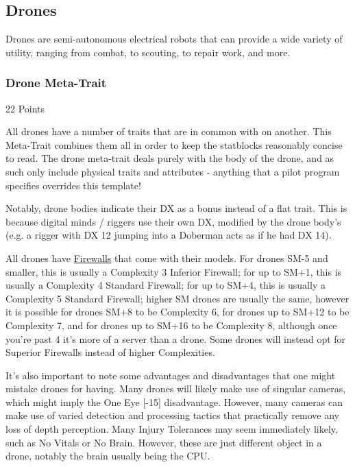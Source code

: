 \subsection{Drones}\label{drones}

Drones are semi-autonomous electrical robots that can provide a wide variety of utility, ranging from combat, to scouting, to repair work, and more.

\subsubsection{Drone Meta-Trait}
\begin{flushright}
	22 Points
\end{flushright}

All drones have a number of traits that are in common with on another. This Meta-Trait combines them all in order to keep the statblocks reasonably concise to read. The drone meta-trait deals purely with the body of the drone, and as such only include physical traits and attributes - anything that a pilot program specifies overrides this template!

Notably, drone bodies indicate their DX as a bonus instead of a flat trait. This is because digital minds / riggers use their own DX, modified by the drone body's (e.g. a rigger with DX 12 jumping into a Doberman acts as if he had DX 14).

All drones have \hyperref[firewall]{Firewalls} that come with their models. For drones SM-5 and smaller, this is usually a Complexity 3 Inferior Firewall; for up to SM+1, this is usually a Complexity 4 Standard Firewall; for up to SM+4, this is usually a Complexity 5 Standard Firewall; higher SM drones are usually the same, however it is possible for drones SM+8 to be Complexity 6, for drones up to SM+12 to be Complexity 7, and for drones up to SM+16 to be Complexity 8, although once you're past 4 it's more of a server than a drone. Some drones will instead opt for Superior Firewalls instead of higher Complexities.

It's also important to note some advantages and disadvantages that one might mistake drones for having. Many drones will likely make use of singular cameras, which might imply the One Eye [-15] disadvantage. However, many cameras can make use of varied detection and processing tactics that practically remove any loss of depth perception. Many Injury Tolerances may seem immediately likely, such as No Vitals or No Brain. However, these are just different object in a drone, notably the brain usually being the CPU.

